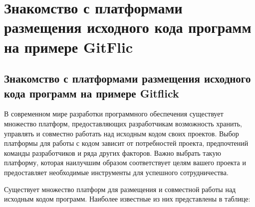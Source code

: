 \documentclass[letterpaper,10pt,russian]{sphinxmanual}
\begin{document}
\chapter{Знакомство с платформами размещения исходного кода программ на примере GitFlic}
\label{\detokenize{index:gitflic}}
\sphinxstepscope


\section{Знакомство с платформами размещения исходного кода программ на примере Gitflick}
\label{\detokenize{educational_materials/team_work_on_a_gitflic/content:gitflick}}\label{\detokenize{educational_materials/team_work_on_a_gitflic/content::doc}}
\sphinxAtStartPar
В современном мире разработки программного обеспечения существует множество платформ, предоставляющих разработчикам возможность хранить, управлять и совместно работать над исходным кодом своих проектов. Выбор платформы для работы с кодом зависит от потребностей проекта, предпочтений команды разработчиков и ряда других факторов. Важно выбрать такую платформу, которая наилучшим образом соответствует целям вашего проекта и предоставляет необходимые инструменты для успешного сотрудничества.

\sphinxAtStartPar
Существует множество платформ для размещения и совместной работы над исходным кодом программ. Наиболее известные из них представлены в таблице:
\end{document}
